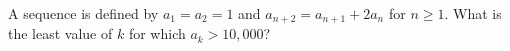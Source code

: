 A sequence is defined by $a_1=a_2=1$ and $a_{n+2}=a_{n+1}+2a_n$ for $n\ge1$. What is the least value of $k$ for which $a_k>10{,}000$?
